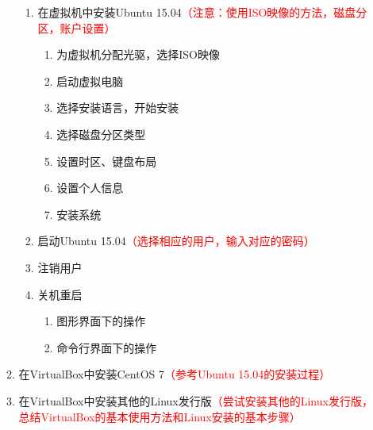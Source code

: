 \documentclass{TIJMUjiaoanSY}
\begin{document}
\begin{enumerate}
\begin{enumerate}
\begin{enumerate}
	  \item 在虚拟机中安装Ubuntu 15.04\textcolor{red}{（注意：使用ISO映像的方法，磁盘分区，账户设置）}
	    \begin{enumerate}
	      \item 为虚拟机分配光驱，选择ISO映像
	      \item 启动虚拟电脑
	      \item 选择安装语言，开始安装
	      \item 选择磁盘分区类型
	      \item 设置时区、键盘布局
	      \item 设置个人信息
	      \item 安装系统
	    \end{enumerate}
	  \item 启动Ubuntu 15.04\textcolor{red}{（选择相应的用户，输入对应的密码）}
	  \item 注销用户
	  \item 关机重启
	    \begin{enumerate}
	      \item 图形界面下的操作
	      \item 命令行界面下的操作
	    \end{enumerate}
	\end{enumerate}
      \item 在VirtualBox中安装CentOS 7\textcolor{red}{（参考Ubuntu 15.04的安装过程）}
      \item 在VirtualBox中安装其他的Linux发行版\textcolor{red}{（尝试安装其他的Linux发行版，总结VirtualBox的基本使用方法和Linux安装的基本步骤）}
    \end{enumerate}
\end{enumerate}


\otherTail
\end{document}
